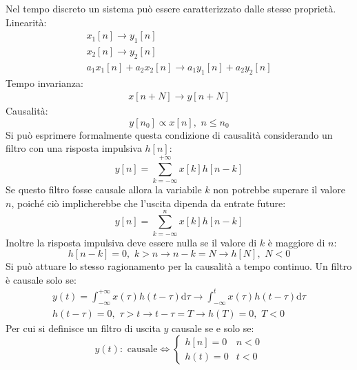 \documentclass{article}
\newcommand{\df}{\mathrm{d}}
\numberwithin{equation}{subsection}
\begin{document}
Nel tempo discreto un sistema può essere caratterizzato dalle stesse proprietà. 
Linearità:
\begin{gather*}
    x_1[n]\to y_1[n]\\
    x_2[n]\to y_2[n]\\
    a_1x_1[n]+a_2x_2[n]\to a_1y_1[n]+a_2y_2[n]
\end{gather*}
Tempo invarianza:
\begin{gather*}
    x[n+N]\to y[n+N]
\end{gather*}
Causalità:
\begin{equation*}
    y[n_0]\propto x[n],\,\, n\leq n_0
\end{equation*}
Si può esprimere formalmente questa condizione di causalità considerando un filtro con una risposta impulsiva $h[n]$:
\begin{equation*}
    y[n]=\displaystyle\sum_{k=-\infty}^{+\infty}x[k]h[n-k]
\end{equation*} 
Se questo filtro fosse causale allora la variabile $k$ non potrebbe superare il valore $n$, poiché ciò implicherebbe che l'uscita dipenda da entrate future:
\begin{equation*}
    y[n]=\displaystyle\sum_{k=-\infty}^nx[k]h[n-k]
\end{equation*}
Inoltre la risposta impulsiva deve essere nulla se il valore di $k$ è maggiore di $n$:
\begin{equation*}
    h[n-k]=0,\,\, k>n\to{n-k=N}\to h[N],\,\, N<0
\end{equation*} 
Si può attuare lo stesso ragionamento per la causalità a tempo continuo. Un filtro è causale solo se:
\begin{gather*}
    y(t)=\displaystyle\int_{-\infty}^{+\infty}x(\tau)h(t-\tau)\df\tau\to \int_{-\infty}^{t}x(\tau)h(t-\tau)\df\tau\\
    h(t-\tau)=0,\,\, \tau>t\to{t-\tau=T}\to h(T)=0,\,\, T<0
\end{gather*}
Per cui si definisce un filtro di uscita $y$ causale se e solo se:
\begin{equation*}
    y(t):\mbox{ causale}\iff \begin{cases}
        h[n]=0& n<0\\
        h(t)=0& t<0
    \end{cases}
\end{equation*}
\end{document}
